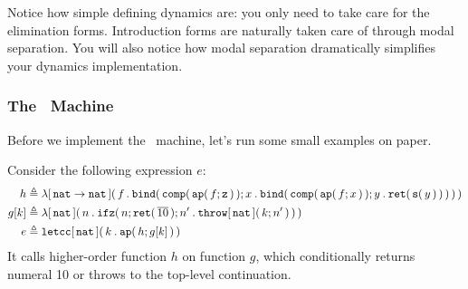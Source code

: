 \documentclass[11pt]{article}
\begin{document}
Notice how simple defining dynamics are: you only need to take care for the elimination forms.
Introduction forms are naturally taken care of through modal separation.
You will also notice how modal separation dramatically simplifies your dynamics implementation.

\subsubsection{The \MachK~Machine}

Before we implement the \MachK~machine, let's run some small \LangKPCFv{} examples on paper.

Consider the following expression $e$:
\begin{align*}
  h &\isdef{} \lamabt{\arrtycst{\nattycst}{\nattycst}}{f}{\bindabt{\compabt{\appabt{f}{\zeroabt}}}{x}{\bindabt{\compabt{\appabt{f}{x}}}{y}{\retabt{\succabt{y}}}}} \\
  g[k] &\isdef{} \lamabt{\nattycst}{n}{\ifzabt{n}{\retabt{\numeral{10}}}{n'}{\throwabt{\nattycst}{k}{n'}}} \\
  e &\isdef{} \letccabt{\nattycst}{k}{\appabt{h}{g[k]}}
\end{align*}
It calls higher-order function $h$ on function $g$, which conditionally returns numeral 10 or throws to the top-level continuation.
\end{document}
